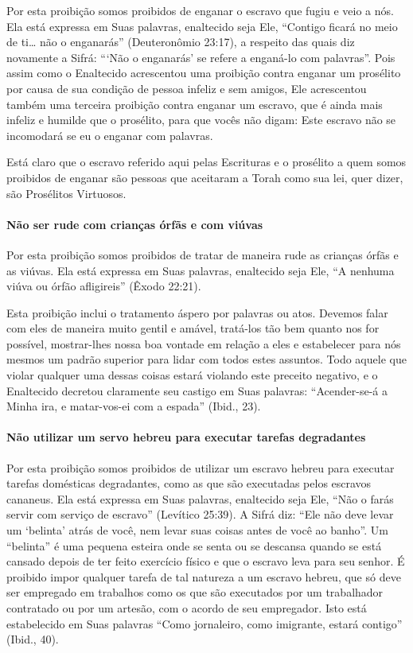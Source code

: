 Por esta proibição somos proibidos de enganar o escravo que fugiu e veio
a nós. Ela está expressa em Suas palavras, enaltecido seja Ele,
``Contigo ficará no meio de ti\ldots{} não o enganarás'' (Deuteronômio
23:17), a respeito das quais diz novamente a Sifrá: ```Não o enganarás'
se refere a enganá-lo com palavras''. Pois assim como o Enaltecido
acrescentou uma proibição contra enganar um prosélito por causa de sua
condição de pessoa infeliz e sem amigos, Ele acrescentou também uma
terceira proibição contra enganar um escravo, que é ainda mais infeliz e
humilde que o prosélito, para que vocês não digam: Este escravo não se
incomodará se eu o enganar com palavras.

Está claro que o escravo referido aqui pelas Escrituras e o prosélito a
quem somos proibidos de enganar são pessoas que aceitaram a Torah como
sua lei, quer dizer, são Prosélitos Virtuosos.

\paragraph{Não ser rude com crianças órfãs e com viúvas}

Por esta proibição somos proibidos de tratar de maneira rude as
crianças órfãs e as viúvas. Ela está expressa em Suas palavras,
enaltecido seja Ele, ``A nenhuma viúva ou órfão afligireis'' (Êxodo
22:21).


Esta proibição inclui o tratamento áspero por palavras ou atos. Devemos
falar com eles de maneira muito gentil e amável, tratá-los tão bem
quanto nos for possível, mostrar-lhes nossa boa vontade em relação a
eles e estabelecer para nós mesmos um padrão superior para lidar com
todos estes assuntos. Todo aquele que violar qualquer uma dessas coisas
estará violando este preceito negativo, e o Enaltecido decretou
claramente seu castigo em Suas palavras: ``Acender-se-á a Minha ira, e
matar-vos-ei com a espada'' (Ibid., 23).

\paragraph{Não utilizar um servo hebreu para executar tarefas degradantes}

Por esta proibição somos proibidos de utilizar um escravo hebreu para
executar tarefas domésticas degradantes, como as que são executadas
pelos escravos cananeus. Ela está expressa em Suas palavras, enaltecido
seja Ele, ``Não o farás servir com serviço de escravo'' (Levítico
25:39). A Sifrá diz: ``Ele não deve levar um `belinta' atrás de você,
nem levar suas coisas antes de você ao banho''. Um ``belinta'' é uma
pequena esteira onde se senta ou se descansa quando se está cansado
depois de ter feito exercício físico e que o escravo leva para seu
senhor. É proibido impor qualquer tarefa de tal natureza a um escravo
hebreu, que só deve ser empregado em trabalhos como os que são
executados por um trabalhador contratado ou por um artesão, com o acordo
de seu empregador. Isto está estabelecido em Suas palavras ``Como
jornaleiro, como imigrante, estará contigo'' (Ibid., 40).

